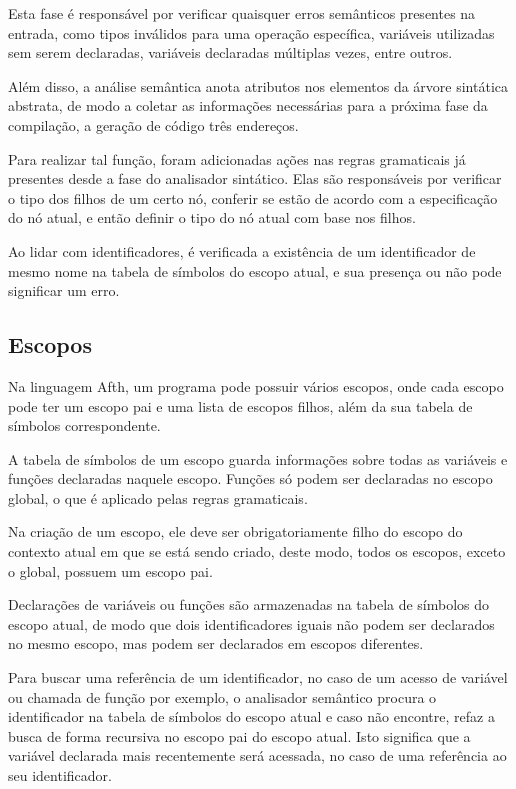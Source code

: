 \documentclass[
	article,			%
	11pt,				%
	oneside,			%
	a4paper,			%
	english,			%
	brazil,				%
	sumario=tradicional
	]{abntex2}
\begin{document}
Esta fase é responsável por verificar quaisquer erros semânticos presentes na entrada, como tipos inválidos para uma operação específica, variáveis utilizadas sem serem declaradas, variáveis declaradas múltiplas vezes, entre outros.

Além disso, a análise semântica anota atributos nos elementos da árvore sintática abstrata, de modo a coletar as informações necessárias para a próxima fase da compilação, a geração de código três endereços.

Para realizar tal função, foram adicionadas ações nas regras gramaticais já presentes desde a fase do analisador sintático. Elas são responsáveis por verificar o tipo dos filhos de um certo nó, conferir se estão de acordo com a especificação do nó atual, e então definir o tipo do nó atual com base nos filhos.

Ao lidar com identificadores, é verificada a existência de um identificador de mesmo nome na tabela de símbolos do escopo atual, e sua presença ou não pode significar um erro.

\subsection{Escopos}

Na linguagem Afth, um programa pode possuir vários escopos, onde cada escopo pode ter um escopo pai e uma lista de escopos filhos, além da sua tabela de símbolos correspondente.

A tabela de símbolos de um escopo guarda informações sobre todas as variáveis e funções declaradas naquele escopo. Funções só podem ser declaradas no escopo global, o que é aplicado pelas regras gramaticais.

Na criação de um escopo, ele deve ser obrigatoriamente filho do escopo do contexto atual em que se está sendo criado, deste modo, todos os escopos, exceto o global, possuem um escopo pai.

Declarações de variáveis ou funções são armazenadas na tabela de símbolos do escopo atual, de modo que dois identificadores iguais não podem ser declarados no mesmo escopo, mas podem ser declarados em escopos diferentes.

Para buscar uma referência de um identificador, no caso de um acesso de variável ou chamada de função por exemplo, o analisador semântico procura o identificador na tabela de símbolos do escopo atual e caso não encontre, refaz a busca de forma recursiva no escopo pai do escopo atual. Isto significa que a variável declarada mais recentemente será acessada, no caso de uma referência ao seu identificador.
\end{document}
